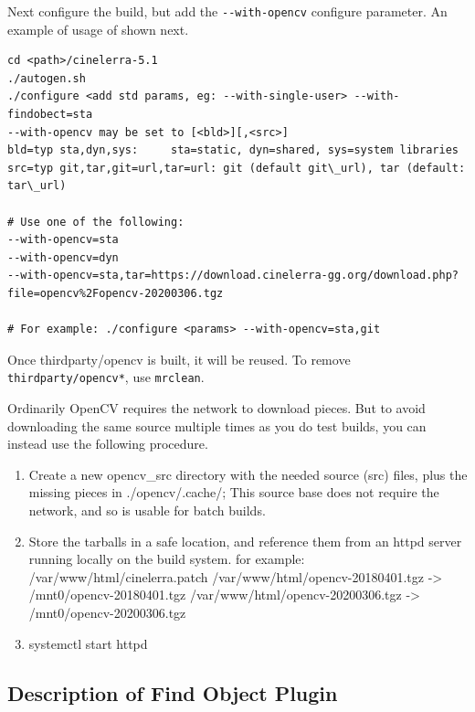 Next configure the build, but add the \texttt{-{}-with-opencv} configure parameter. An example
of usage of shown next.

\begin{lstlisting}[style=sh]
cd <path>/cinelerra-5.1
./autogen.sh
./configure <add std params, eg: --with-single-user> --with-findobect=sta
--with-opencv may be set to [<bld>][,<src>]
bld=typ sta,dyn,sys:	 sta=static, dyn=shared, sys=system libraries
src=typ git,tar,git=url,tar=url: git (default git\_url), tar (default: tar\_url)

# Use one of the following:
--with-opencv=sta
--with-opencv=dyn
--with-opencv=sta,tar=https://download.cinelerra-gg.org/download.php?file=opencv%2Fopencv-20200306.tgz

# For example: ./configure <params> --with-opencv=sta,git
\end{lstlisting}

Once thirdparty/opencv is built, it will be reused.  To remove \texttt{thirdparty/opencv*}, use
\texttt{mrclean}.

Ordinarily OpenCV requires the network to download pieces. But to avoid downloading the same
source multiple times as you do test builds, you can instead use the following procedure.

\begin{enumerate}
     \item Create a new opencv\_src directory with the needed source (src) files, plus
the missing pieces in ./opencv/.cache/;  This source base does not require the network, and
so is usable for batch builds.  
     \item Store the tarballs in a safe location, and reference them from an httpd server
running locally on the build system.  for example:\newline
/var/www/html/cinelerra.patch\newline
/var/www/html/opencv-20180401.tgz -> /mnt0/opencv-20180401.tgz\newline
/var/www/html/opencv-20200306.tgz -> /mnt0/opencv-20200306.tgz\newline
     \item systemctl start httpd
\end{enumerate}

\subsection{Description of Find Object Plugin}%
\label{sub:description_findobj_plugin}

